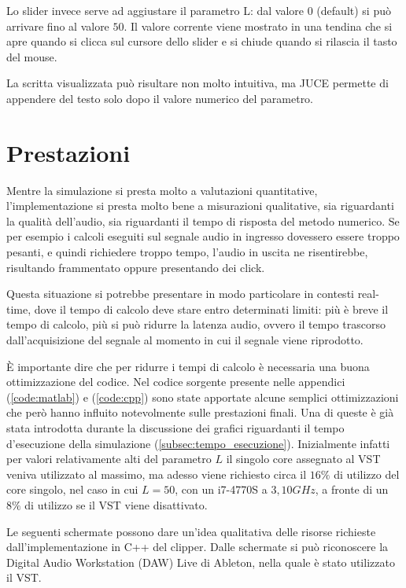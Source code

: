 		Lo slider invece serve ad aggiustare il parametro L: dal valore $0$ (default) si può arrivare fino al valore $50$. Il valore corrente viene mostrato in una tendina che si apre quando si clicca sul cursore dello slider e si chiude quando si rilascia il tasto del mouse.
		
		La scritta visualizzata può risultare non molto intuitiva, ma JUCE permette di appendere del testo solo dopo il valore numerico del parametro.
	
	\section{Prestazioni}
		Mentre la simulazione si presta molto a valutazioni quantitative, l'implementazione si presta molto bene a misurazioni qualitative, sia riguardanti la qualità dell'audio, sia riguardanti il tempo di risposta del metodo numerico. Se per esempio i calcoli eseguiti sul segnale audio in ingresso dovessero essere troppo pesanti, e quindi richiedere troppo tempo, l'audio in uscita ne risentirebbe, risultando frammentato oppure presentando dei click.
		
		Questa situazione si potrebbe presentare in modo particolare in contesti real-time, dove il tempo di calcolo deve stare entro determinati limiti: più è breve il tempo di calcolo, più si può ridurre la latenza audio, ovvero il tempo trascorso dall'acquisizione del segnale al momento in cui il segnale viene riprodotto.
		
		È importante dire che per ridurre i tempi di calcolo è necessaria una buona ottimizzazione del codice. Nel codice sorgente presente nelle appendici (\ref{code:matlab}) e (\ref{code:cpp}) sono state apportate alcune semplici ottimizzazioni che però hanno influito notevolmente sulle prestazioni finali. Una di queste è già stata introdotta durante la discussione dei grafici riguardanti il tempo d'esecuzione della simulazione (\ref{subsec:tempo_esecuzione}). Inizialmente infatti per valori relativamente alti del parametro $L$ il singolo core assegnato al VST veniva utilizzato al massimo, ma adesso viene richiesto circa il $16\%$ di utilizzo del core singolo, nel caso in cui $L = 50$, con un i7-4770S a $3,10GHz$, a fronte di un $8\%$ di utilizzo se il VST viene disattivato.
		
		Le seguenti schermate possono dare un'idea qualitativa delle risorse richieste dall'implementazione in C++ del clipper. Dalle schermate si può riconoscere la Digital Audio Workstation (DAW) Live di Ableton, nella quale è stato utilizzato il VST.
		
